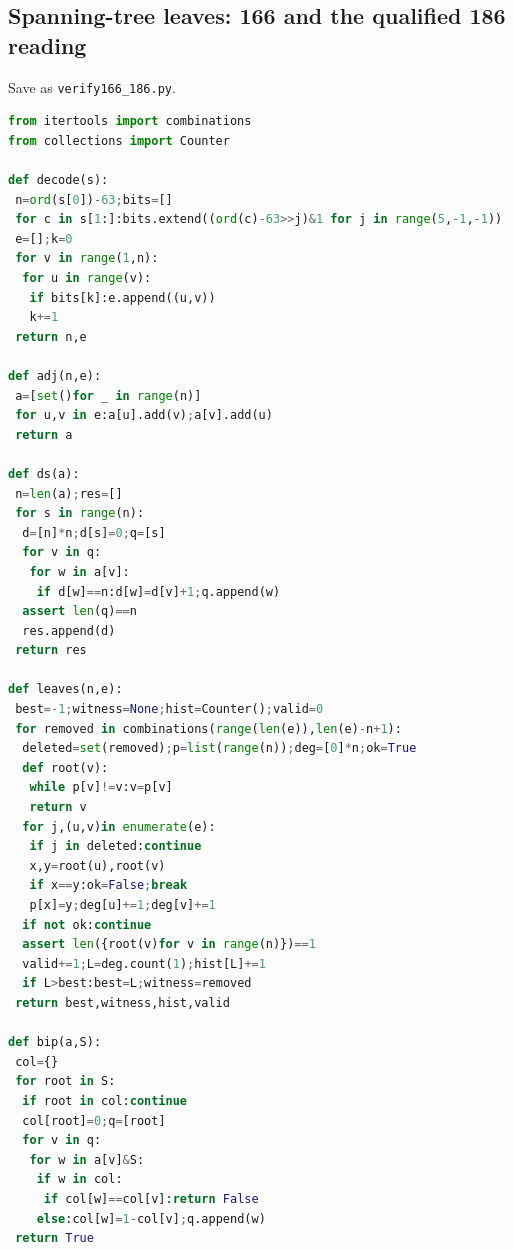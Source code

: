 \documentclass[11pt,a4paper]{article}
\theoremstyle{remark}
\begin{document}
\subsection{Spanning-tree leaves: 166 and the qualified 186 reading}
Save as \texttt{verify166\_186.py}.
\begin{lstlisting}[language=Python]
from itertools import combinations
from collections import Counter

def decode(s):
 n=ord(s[0])-63;bits=[]
 for c in s[1:]:bits.extend((ord(c)-63>>j)&1 for j in range(5,-1,-1))
 e=[];k=0
 for v in range(1,n):
  for u in range(v):
   if bits[k]:e.append((u,v))
   k+=1
 return n,e

def adj(n,e):
 a=[set()for _ in range(n)]
 for u,v in e:a[u].add(v);a[v].add(u)
 return a

def ds(a):
 n=len(a);res=[]
 for s in range(n):
  d=[n]*n;d[s]=0;q=[s]
  for v in q:
   for w in a[v]:
    if d[w]==n:d[w]=d[v]+1;q.append(w)
  assert len(q)==n
  res.append(d)
 return res

def leaves(n,e):
 best=-1;witness=None;hist=Counter();valid=0
 for removed in combinations(range(len(e)),len(e)-n+1):
  deleted=set(removed);p=list(range(n));deg=[0]*n;ok=True
  def root(v):
   while p[v]!=v:v=p[v]
   return v
  for j,(u,v)in enumerate(e):
   if j in deleted:continue
   x,y=root(u),root(v)
   if x==y:ok=False;break
   p[x]=y;deg[u]+=1;deg[v]+=1
  if not ok:continue
  assert len({root(v)for v in range(n)})==1
  valid+=1;L=deg.count(1);hist[L]+=1
  if L>best:best=L;witness=removed
 return best,witness,hist,valid

def bip(a,S):
 col={}
 for root in S:
  if root in col:continue
  col[root]=0;q=[root]
  for v in q:
   for w in a[v]&S:
    if w in col:
     if col[w]==col[v]:return False
    else:col[w]=1-col[v];q.append(w)
 return True


\end{lstlisting}
\end{document}
